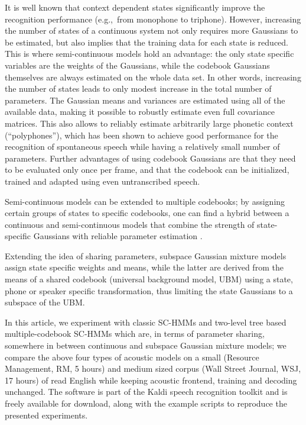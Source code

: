 \documentclass{article}
\begin{document}
It is well known that context dependent states significantly improve the
recognition performance (e.g.,~from monophone to triphone). However, 
increasing the number of states of a continuous system not only requires more 
Gaussians to be estimated, but also implies that the training data for each state 
is reduced.
%
This is where semi-continuous models hold an advantage: the only state specific 
variables are the weights of the Gaussians, while the codebook Gaussians 
themselves are always estimated on the whole data set. 
In other words, increasing the number of states leads to only modest increase 
in the total number of parameters. The Gaussian means and variances are estimated 
using all of the available data, making it possible to robustly estimate even full 
covariance matrices.
%
This also allows to reliably estimate arbitrarily large phonetic context 
(``polyphones''), which has been shown to achieve good performance for the 
recognition of spontaneous  speech \cite{schukattalamazzini1994srf,schukattalamazzini1995as} 
while having a relatively small number of parameters.
%
Further advantages of using codebook Gaussians are that they need to be 
evaluated only once per frame, and that the codebook can be initialized, trained
and adapted using even untranscribed speech.

Semi-continuous models can be extended to multiple codebooks; by
assigning certain groups of states to specific codebooks, one can find a
hybrid between a continuous and semi-continuous models that combine the strength
of state-specific Gaussians with reliable parameter estimation \cite{prasad2004t2b}.

Extending the idea of sharing parameters, subspace Gaussian mixture models
\cite{povey2011sgm} assign state specific weights and means, while the latter
are derived from the means of a shared codebook (universal background model, UBM)
using a state, phone or speaker specific transformation, thus limiting the state
Gaussians to a subspace of the UBM.

In this article, we experiment with classic SC-HMMs and two-level tree based 
multiple-codebook SC-HMMs which are, in terms of parameter sharing, somewhere in 
between continuous and subspace Gaussian mixture models; 
we compare the above four types of acoustic models on a small (Resource Management, RM, 5 hours)
and medium sized corpus (Wall Street Journal, WSJ, 17 hours) of read English while keeping acoustic 
frontend, training and decoding unchanged. 
The software is part of the {\sc Kaldi} speech recognition toolkit 
\cite{povey2011tks} and is freely available for download, along with the
example scripts to reproduce the presented experiments.
\end{document}
